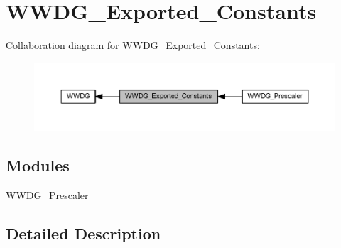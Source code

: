 \hypertarget{group___w_w_d_g___exported___constants}{}\section{W\+W\+D\+G\+\_\+\+Exported\+\_\+\+Constants}
\label{group___w_w_d_g___exported___constants}
Collaboration diagram for W\+W\+D\+G\+\_\+\+Exported\+\_\+\+Constants\+:
\nopagebreak
\begin{figure}[H]
\begin{center}
\leavevmode
\includegraphics[width=350pt]{group___w_w_d_g___exported___constants}
\end{center}
\end{figure}
\subsection*{Modules}
\begin{DoxyCompactItemize}
\item 
\hyperlink{group___w_w_d_g___prescaler}{W\+W\+D\+G\+\_\+\+Prescaler}
\end{DoxyCompactItemize}


\subsection{Detailed Description}
